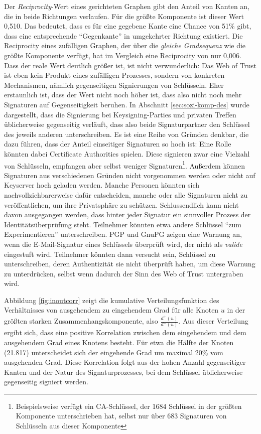 Der \emph{Reciprocity}-Wert eines gerichteten Graphen gibt den Anteil
von Kanten an, die in beide Richtungen verlaufen. Für die größte
Komponente ist dieser Wert 0,510. Das bedeutet, dass es für eine
gegebene Kante eine Chance von 51\% gibt, dass eine entsprechende
``Gegenkante'' in umgekehrter Richtung existiert. Die Reciprocity
eines zufälligen Graphen, der über die \emph{gleiche Gradsequenz}
wie die größte Komponente verfügt, hat im Vergleich eine
Reciprocity von nur 0,006. Dass der reale Wert deutlich größer ist,
ist nicht verwunderlich: Das Web of Trust ist eben kein Produkt eines
zufälligen Prozesses, sondern von konkreten Mechanismen, nämlich
gegenseitigen Signierungen von Schlüsseln. Eher erstaunlich ist,
dass der Wert nicht noch höher ist, dass also nicht noch mehr
Signaturen auf Gegenseitigkeit beruhen. In Abschnitt
\ref{sec:sozi-komp-des} wurde dargestellt, dass die Signierung bei
Keysigning-Parties und privaten Treffen üblicherweise gegenseitig
verläuft, dass also beide Signaturpartner den Schlüssel des
jeweils anderen unterschreiben. Es ist eine Reihe von Gründen
denkbar, die dazu führen, dass der Anteil einseitiger Signaturen so
hoch ist: Eine Rolle könnten dabei Certificate Authorities
spielen. Diese signieren zwar eine Vielzahl von Schlüsseln,
empfangen aber selbst weniger Signaturen\footnote{Beispielsweise
  verfügt ein CA-Schlüssel, der 1684 Schlüssel in der größten
  Komponente unterschrieben hat, selbst nur über 683 Signaturen von
  Schlüsseln aus dieser Komponente}. Außerdem können Signaturen
aus verschiedenen Gründen nicht vorgenommen werden oder nicht auf
Keyserver hoch geladen werden. Manche Personen könnten sich
nachvollziehbarerweise dafür entscheiden, manche oder alle
Signaturen nicht zu veröffentlichen, um ihre Privatsphäre zu
schützen. Schlussendlich kann nicht davon ausgegangen werden, dass
hinter jeder Signatur ein sinnvoller Prozess der
Identitätsüberprüfung steht. Teilnehmer könnten etwa andere
Schlüssel ``zum Experimentieren'' unterschreiben. PGP und GnuPG
zeigen eine Warnung an, wenn die E-Mail-Signatur eines Schlüssels
überprüft wird, der nicht als \emph{valide} eingestuft
wird. Teilnehmer könnten dann versucht sein, Schlüssel zu
unterschreiben, deren Authentizität sie nicht überprüft haben,
um diese Warnung zu unterdrücken, selbst wenn dadurch der Sinn des
Web of Trust untergraben wird.

Abbildung \ref{fig:inoutcorr} zeigt die kumulative Verteilungsfunktion
des Verhältnisses von ausgehendem zu eingehendem Grad für alle
Knoten $u$ in der größten starken Zusammenhangskomponente, also
$\frac{d^+(u)}{d^-(u)}$. Aus dieser Verteilung ergibt sich, dass eine
positive Korrelation zwischen dem eingehendem und dem ausgehendem Grad
eines Knotens besteht. Für etwa die Hälfte der Knoten (21.817)
unterscheidet sich der eingehende Grad um maximal 20\% vom ausgehenden
Grad. Diese Korrelation folgt aus der hohen Anzahl gegenseitiger
Kanten und der Natur des Signaturprozesses, bei dem Schlüssel
üblicherweise gegenseitig signiert werden.

